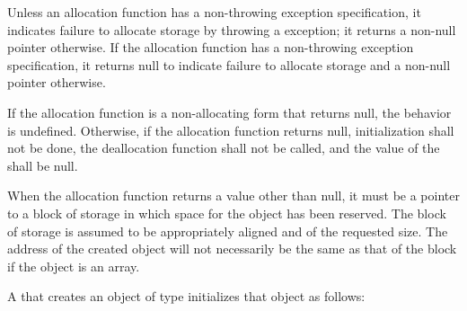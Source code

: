 \pnum
\begin{note}
Unless an allocation function has a non-throwing
exception specification,
it indicates failure to allocate storage by throwing a
%
%
exception;
it returns a non-null pointer otherwise. If the allocation function
has a non-throwing exception specification,
it returns null to indicate failure to allocate storage
and a non-null pointer otherwise.
\end{note}
If the allocation function is a non-allocating
form that returns null,
the behavior is undefined.
%
%
%
%
%
Otherwise,
if the allocation function returns null, initialization shall not be
done, the deallocation function shall not be called, and the value of
the  shall be null.

\pnum
\begin{note}
When the allocation function returns a value other than null, it must be
a pointer to a block of storage in which space for the object has been
reserved. The block of storage is assumed to be
appropriately aligned
and of the requested size. The address of the created object will not
necessarily be the same as that of the block if the object is an array.
\end{note}

\pnum
{}%
%
%
%
A  that creates an object of type 
initializes that object as follows:

